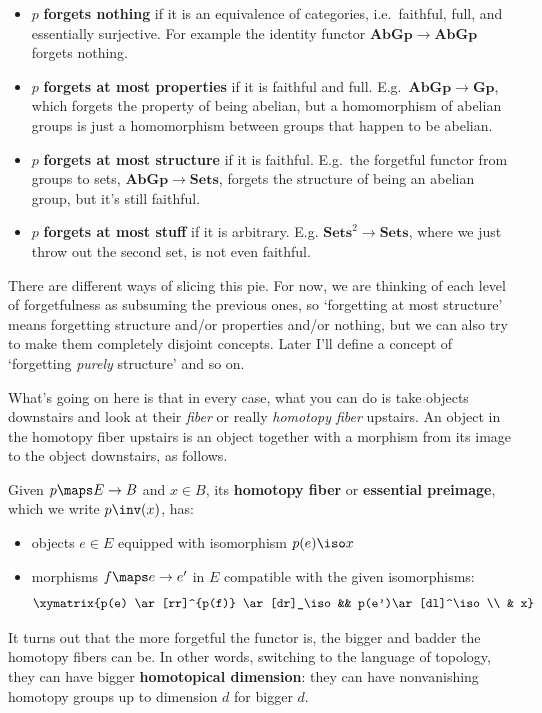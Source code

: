 \documentclass[12pt]{amsart}
\begin{document}
\begin{itemize}
\item $p$ \textbf{forgets nothing} if it is an equivalence of categories,
  i.e.\ faithful, full, and essentially surjective.  For example
   the identity functor $\mathbf{AbGp}\to\mathbf{AbGp}$ forgets nothing.
\item $p$ \textbf{forgets at most properties} if it is faithful and
  full.  E.g.\ $\mathbf{AbGp}\to\mathbf{Gp}$, which forgets the
  property of being abelian, but a homomorphism of abelian groups is
  just a homomorphism between groups that happen to be abelian.
\item $p$ \textbf{forgets at most structure} if it is faithful.  E.g.\
  the forgetful functor from groups 
  to sets, $\mathbf{AbGp}\to\mathbf{Sets}$, forgets the structure of
  being an abelian group, but it's still faithful.
\item $p$ \textbf{forgets at most stuff} if it is arbitrary.  E.g.
  $\textbf{Sets}^2\to\mathbf{Sets}$, where we just throw out the
  second set, is not even faithful.
\end{itemize}

There are different ways of slicing this pie.
For now, we are thinking of each level of forgetfulness as
subsuming the previous ones, 
so `forgetting at most structure' means forgetting structure 
and/or properties and/or nothing, but we can also try to make
them completely disjoint concepts.  Later I'll define
a concept of `forgetting {\it purely} structure' and so on.

What's going on here is that in every case, what you can do is take
objects downstairs and look at their \emph{fiber} or really
\emph{homotopy fiber} upstairs.  An object in the homotopy fiber
upstairs is an object together with a morphism from its image to the
object downstairs, as follows.

Given $p\maps E\to B$ and $x\in B$, its \textbf{homotopy fiber} or
\textbf{essential preimage}, which we write $p\inv(x)$, has:
\begin{itemize}
\item objects $e\in E$ equipped with isomorphism $p(e)\iso x$
\item morphisms $f\maps  e \to e'$ in $E$ compatible with the 
  given isomorphisms:
  \[\xymatrix{p(e) \ar[rr]^{p(f)} \ar[dr]_\iso && p(e')\ar[dl]^\iso \\ & x}\]
\end{itemize}

It turns out that the more forgetful the functor is, the bigger and
badder the homotopy fibers can be.  In other words, switching to the 
language of topology, they can have bigger \textbf{homotopical dimension}: 
they can have nonvanishing homotopy groups up to dimension $d$ for bigger 
$d$.  
\end{document}
